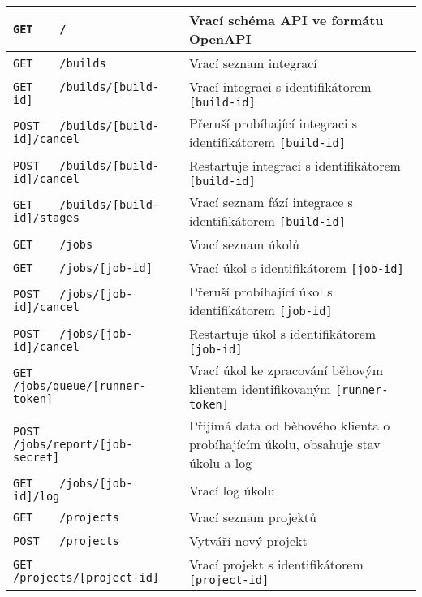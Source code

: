 \begin{sidewaystable}[ht]
\fontsize{7.5}{9.5}\selectfont
\centering
\begin{tabular}{|l|l|}
\hline
\verb|GET    /|                                          & Vrací schéma API ve formátu OpenAPI \\ \hline
\verb|GET    /builds|                                    & Vrací seznam integrací \\ \hline
\verb|GET    /builds/[build-id]|                         & Vrací integraci s identifikátorem \verb|[build-id]| \\ \hline
\verb|POST   /builds/[build-id]/cancel|                  & Přeruší probíhající integraci s identifikátorem \verb|[build-id]| \\ \hline
\verb|POST   /builds/[build-id]/cancel|                  & Restartuje integraci s identifikátorem \verb|[build-id]| \\ \hline
\verb|GET    /builds/[build-id]/stages|                  & Vrací seznam fází integrace s identifikátorem \verb|[build-id]| \\ \hline
\verb|GET    /jobs|                                      & Vrací seznam úkolů \\ \hline
\verb|GET    /jobs/[job-id]|                             & Vrací úkol s identifikátorem \verb|[job-id]| \\ \hline
\verb|POST   /jobs/[job-id]/cancel|                      & Přeruší probíhající úkol s identifikátorem \verb|[job-id]| \\ \hline
\verb|POST   /jobs/[job-id]/cancel|                      & Restartuje úkol s identifikátorem \verb|[job-id]| \\ \hline
\verb|GET    /jobs/queue/[runner-token]|                 & Vrací úkol ke zpracování běhovým klientem identifikovaným \verb|[runner-token]| \\ \hline
\verb|POST   /jobs/report/[job-secret]|                  & Přijímá data od běhového klienta o probíhajícím úkolu, obsahuje stav úkolu a log \\ \hline
\verb|GET    /jobs/[job-id]/log|                         & Vrací log úkolu \\ \hline
\verb|GET    /projects|                                  & Vrací seznam projektů \\ \hline
\verb|POST   /projects|                                  & Vytváří nový projekt \\ \hline
\verb|GET    /projects/[project-id]|                     & Vrací projekt s identifikátorem \verb|[project-id]| \\ \hline

\end{tabular}
\end{sidewaystable}
